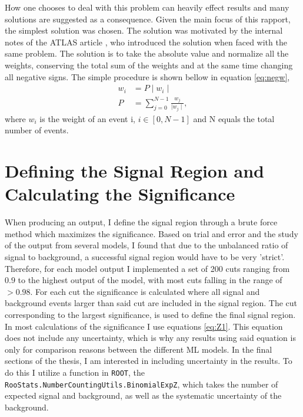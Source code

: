 How one chooses to deal with this problem can heavily effect results and many solutions 
are suggested as a consequence. Given the main focus of this rapport, the 
simplest solution was chosen. The solution was motivated by the internal notes of 
the \ac{ATLAS} article \cite{Aad:2800889}, who introduced the solution when faced with the same 
problem. The solution is to take the absolute value and normalize all the weights, conserving 
the total sum of the weights and at the same time changing all negative signs. The simple procedure 
is shown bellow in equation \ref{eq:negw},
\begin{align}\label{eq:negw}
    w_i & = P \mid w_i \mid\,  \\
    P  & =  \sum_{j=0}^{N-1}\frac{ w_j}{\mid w_j \mid},
\end{align}
where $w_i$ is the weight of an event i, $i \in [0,N-1]$ and N equals the total number of events.
\section{Defining the Signal Region and Calculating the Significance}
When producing an output, I define the signal region through a brute force method which maximizes the significance. 
Based on trial and error and the study of the output from several models, I found that due to the unbalanced ratio of 
signal to background, a successful signal region would have to be very 'strict'. Therefore, for each model output I implemented a 
set of 200 cuts ranging from $0.9$ to the highest output of the model, with most cuts falling in the range of $>0.98$. For each cut
the significance is calculated where all signal and background events larger than said cut are included in the signal region. The cut 
corresponding to the largest significance, is used to define the final signal region.  
\\
In most calculations of the significance I use equations \ref{eq:Z1}. This equation does not include any 
uncertainty, which is why any results using said equation is only for comparison reasons between the different \ac{ML}
models. In the final sections of the thesis, I am interested in including uncertainty in the results. To do this I utilize 
a function in \verb!ROOT!, the \texttt{RooStats.NumberCountingUtils.BinomialExpZ}, which takes the number of expected signal and background, 
as well as the systematic uncertainty of the background.